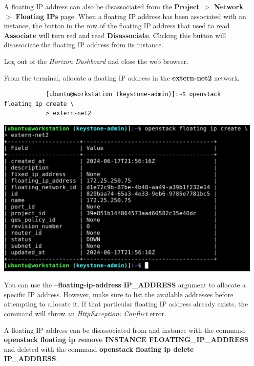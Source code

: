 \documentclass[letterpaper, 12pt]{article}
\begin{document}
\begin{enumerate}
    \begin{tipbox}
        A floating IP address can also be disassociated from the \textbf{Project $>$ Network $>$ Floating IPs} page.
        When a floating IP address has been associated with an instance, the button in the row of the floating IP address that used to read \textbf{Associate} will turn red and read \textbf{Disassociate}.
        Clicking this button will disassociate the floating IP address from its instance.
    \end{tipbox}

    \begin{labstep}
        Log out of the \textit{Horizon Dashboard} and close the web browser.
    \end{labstep}

    \begin{labstep}
        From the terminal, allocate a floating IP address in the \textbf{extern-net2} network.
        \begin{lstlisting}
            [ubuntu@workstation (keystone-admin)]:~$ openstack floating ip create \
            > extern-net2
        \end{lstlisting}

        \begin{center}
            \includegraphics[width=\linewidth]{images/part3/step11.png}
        \end{center}
    \end{labstep}

    \begin{tipbox}
        You can use the \textbf{--floating-ip-address IP\_ADDRESS} argument to allocate a specific IP address.
        However, make sure to list the available addresses before attempting to allocate it.
        If that particular floating IP address already exists, the command will throw an \textit{HttpException: Conflict} error.
    \end{tipbox}
    \begin{tipbox}
        A floating IP address can be disassociated from and instance with the command \textbf{openstack floating ip remove INSTANCE FLOATING\_IP\_ADDRESS} and deleted with the command \textbf{openstack floating ip delete IP\_ADDRESS}.
    \end{tipbox}


\end{enumerate}
\end{document}
